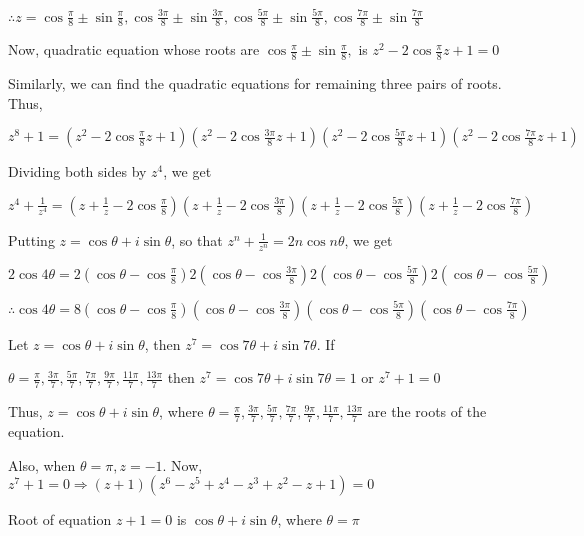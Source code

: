   $\therefore z = \cos\frac{\pi}{8} \pm \sin\frac{\pi}{8}, \cos\frac{3\pi}{8} \pm \sin\frac{3\pi}{8},
  \cos\frac{5\pi}{8} \pm \sin\frac{5\pi}{8}, \cos\frac{7\pi}{8} \pm \sin\frac{7\pi}{8}$

  Now, quadratic equation whose roots are $\cos\frac{\pi}{8} \pm \sin\frac{\pi}{8},$ is $z^2 -
  2\cos\frac{\pi}{8}z + 1 = 0$

  Similarly, we can find the quadratic equations for remaining three pairs of roots. Thus,

  $z^8 + 1 = \left(z^2 - 2\cos\frac{\pi}{8}z + 1\right)\left(z^2 - 2\cos\frac{3\pi}{8}z + 1\right)\left(z^2
  - 2\cos\frac{5\pi}{8}z + 1\right)\left(z^2 - 2\cos\frac{7\pi}{8}z + 1\right)$

  Dividing both sides by $z^4$, we get

  $z^4 + \frac{1}{z^4} = \left(z + \frac{1}{z} - 2\cos\frac{\pi}{8}\right)\left(z + \frac{1}{z} -
  2\cos\frac{3\pi}{8}\right)\left(z + \frac{1}{z} - 2\cos\frac{5\pi}{8}\right)\left(z + \frac{1}{z} -
  2\cos\frac{7\pi}{8}\right)$

  Putting $z = \cos\theta + i\sin\theta$, so that $z^n + \frac{1}{z^n} = 2n\cos n\theta$, we get

  $2\cos 4\theta = 2\left(\cos \theta - \cos\frac{\pi}{8}\right)2\left(\cos \theta -
  \cos\frac{3\pi}{8}\right)2\left(\cos \theta - \cos\frac{5\pi}{8}\right)2\left(\cos \theta -
  \cos\frac{5\pi}{8}\right)$

  $\therefore \cos 4\theta = 8\left(\cos \theta - \cos\frac{\pi}{8}\right)\left(\cos \theta -
  \cos\frac{3\pi}{8}\right)\left(\cos \theta - \cos\frac{5\pi}{8}\right)\left(\cos \theta -
  \cos\frac{7\pi}{8}\right)$
\item Let $z = \cos\theta + i \sin\theta$, then $z^7 = \cos 7\theta + i \sin 7\theta$. If

  $\theta = \frac{\pi}{7}, \frac{3\pi}{7}, \frac{5\pi}{7}, \frac{7\pi}{7}, \frac{9\pi}{7}, \frac{11\pi}{7},
  \frac{13\pi}{7}$ then $z^7 = \cos 7\theta + i \sin 7\theta = 1$ or $z^7 + 1 =0$

  Thus, $z = \cos\theta + i \sin\theta$, where $\theta = \frac{\pi}{7}, \frac{3\pi}{7}, \frac{5\pi}{7},
  \frac{7\pi}{7}, \frac{9\pi}{7}, \frac{11\pi}{7}, \frac{13\pi}{7}$ are the roots of the equation.

  Also, when $\theta = \pi, z = -1$. Now, $z^7 + 1 = 0 \Rightarrow (z + 1)(z^6 - z^5 + z^4 - z^3 + z^2 - z +
  1) = 0$

  Root of equation $z + 1 = 0$ is $\cos \theta + i \sin \theta$, where $\theta = \pi$

